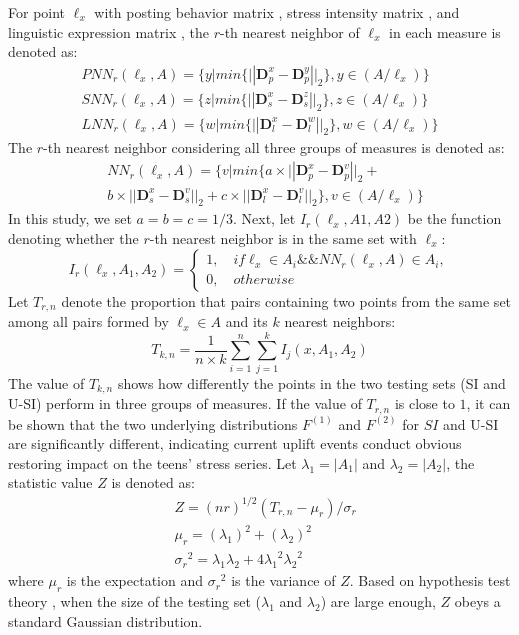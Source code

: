 For point $\ell_x$ with posting behavior matrix , stress intensity matrix ,
and linguistic expression matrix ,
the $r$-th nearest neighbor of $\ell_x$ in each measure is denoted as:
\begin{equation}
\begin{aligned}
& PNN_r(\ell_x,A)
= \{y | min\{||\textbf{D}_p^x-\textbf{D}_p^y ||_2\}, y\in(A/\ell_x)\} &\\
& SNN_r(\ell_x,A)
= \{z | min\{||\textbf{D}_s^x-\textbf{D}_s^z ||_2\}, z\in(A/\ell_x)\} \\
& LNN_r(\ell_x,A)
= \{w | min\{||\textbf{D}_l^x-\textbf{D}_l^w ||_2\}, w\in(A/\ell_x)\} &
 \end{aligned}
 \end{equation}
The $r$-th nearest neighbor considering all three groups of measures is denoted as:
\begin{align}
&NN_r(\ell_x,A) = \{v | min\{a \times ||\textbf{D}_p^x-\textbf{D}_p^v||_2+\\
&b \times ||\textbf{D}_s^x-\textbf{D}_s^v||_2+
c \times ||\textbf{D}_l^x-\textbf{D}_l^v||_2\}, v\in(A/\ell_x) \}
\end{align}
In this study, we set $a = b = c = 1/3$.
Next, let $I_r(\ell_x,A1,A2)$ be the function denoting whether the $r$-th nearest neighbor is in the same set with $\ell_x$:
\begin{equation}
I_r(\ell_x,A_1,A_2) =
\left\{ \begin{array}{ll}
1, \quad if \ell_x \in A_i  \&\& NN_r(\ell_x,A)\in A_i,\\
0, \quad otherwise
\end{array}
\right.
\end{equation}
Let $T_{r,n}$ denote the proportion that pairs containing two points from the same set among all pairs formed by $\ell_x \in A$
and its $k$ nearest neighbors:
\begin{equation}
T_{k,n}= \frac{1}{n\times k}\sum_{i=1}^{n}\sum_{j=1}^{k}I_j(x,A_1,A_2)
\end{equation}
The value of $T_{k,n}$ shows how differently the points in the two testing sets (SI and U-SI) perform in three groups of measures.
If the value of $T_{r,n}$ is close to $1$,
it can be shown that the two underlying distributions $F^{(1)}$ and $F^{(2)}$ for $SI$ and U-SI are significantly different,
indicating current uplift events conduct obvious restoring impact on the teens' stress series.
Let $\lambda_1=|A_1|$ and $\lambda_2=|A_2|$, the statistic value $Z$ is denoted as:
\begin{align}
&Z=(nr)^{1/2}(T_{r,n}-\mu_{r})/\sigma_{r}\\
&\mu_r=(\lambda_1)^2+(\lambda_2)^2\\
&{\sigma_r}^2=\lambda_1\lambda_2+4{\lambda_1}^2{\lambda_2}^2
\end{align}
where $\mu_r$ is the expectation and ${\sigma_r}^2$ is the variance of $Z$.
Based on hypothesis test theory \cite{Johnson2012Applied},
when the size of the testing set ($\lambda_1$ and $\lambda_2$) are large enough,
$Z$ obeys a standard Gaussian distribution.

